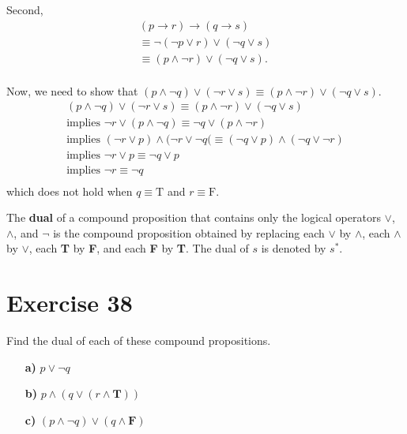 \documentclass{Axon}
\begin{document}
Second,
\begin{gather*}
    (p \to r) \to (q \to s)                             \\
    \equiv \lnot (\lnot p \lor r) \lor (\lnot q \lor s) \\
    \equiv (p \land \lnot r) \lor (\lnot q \lor s).     \\
\end{gather*}

Now, we need to show that \((p \land \lnot q) \lor (\lnot r \lor s) \equiv (p \land \lnot r) \lor (\lnot q \lor s)\).
\begin{gather*}
    (p \land \lnot q) \lor (\lnot r \lor s) \equiv (p \land \lnot r) \lor (\lnot q \lor s)                             \\
    \text{implies } \lnot r \lor (p \land \lnot q) \equiv \lnot q \lor (p \land \lnot r)                               \\
    \text{implies } (\lnot r \lor p) \land (\lnot r \lor \lnot q( \equiv (\lnot q \lor p) \land (\lnot q \lor \lnot r) \\
    \text{implies } \lnot r \lor p \equiv \lnot q \lor p                                                               \\
    \text{implies } \lnot r \equiv \lnot q                                                                             \\
\end{gather*}
which does not hold when \(q \equiv \text{T}\) and \(r \equiv \text{F}\).

The \textbf{dual} of a compound proposition that contains only the logical operators \(\lor\), \(\land\), and \(\lnot\) is the compound proposition obtained by replacing each \(\lor\) by \(\land\), each \(\land\) by \(\lor\), each \textbf{T} by \textbf{F}, and each \textbf{F} by \textbf{T}. The dual of \(s\) is denoted by \(s^*\).

\section*{Exercise 38}
Find the dual of each of these compound propositions.
\begin{enumerate}
    \item[\textbf{a)}] \(p \lor \lnot q\)
    \item[\textbf{b)}] \(p \land (q \lor (r \land \textbf{T}))\)
    \item[\textbf{c)}] \((p \land \lnot q) \lor (q \land \textbf{F})\)
\end{enumerate}
\end{document}
